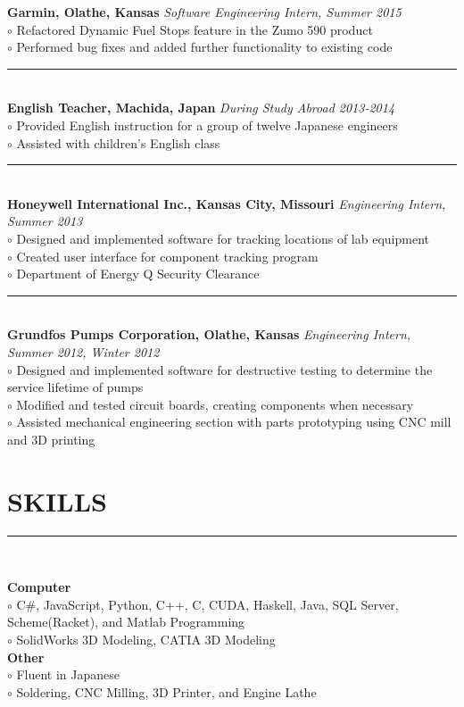 \documentclass[twoside]{article}
\begin{document}
\begin{adjustwidth}{0.2in}{0in}
\textbf{Garmin, Olathe, Kansas} \hfill \textit{Software Engineering Intern, Summer 2015}\\
$\circ$ Refactored Dynamic Fuel Stops feature in the Zumo 590 product\\
$\circ$ Performed bug fixes and added further functionality to existing code\\
\rule{7.3in}{0.5pt}\\
\textbf{English Teacher, Machida, Japan} \hfill \textit{During Study Abroad 2013-2014}\\
$\circ$ Provided English instruction for a group of twelve Japanese engineers\\
$\circ$ Assisted with children's English class\\
\rule{7.3in}{0.5pt}\\
\textbf{Honeywell International Inc., Kansas City, Missouri} \hfill \textit{Engineering Intern, Summer 2013}\\
$\circ$ Designed and implemented software for tracking locations of lab equipment\\
$\circ$ Created user interface for component tracking program\\
$\circ$ Department of Energy Q Security Clearance\\
\rule{7.3in}{0.5pt}\\
\textbf{Grundfos Pumps Corporation, Olathe, Kansas} \hfill \textit{Engineering Intern, Summer 2012, Winter 2012}\\
$\circ$ Designed and implemented software for destructive testing to determine the service lifetime of pumps\\
$\circ$ Modified and tested circuit boards, creating components when necessary\\
$\circ$ Assisted mechanical engineering section with parts prototyping using CNC mill and 3D printing\\
\end{adjustwidth}

\section*{SKILLS}
\vspace{-1em}
\rule{\textwidth}{1pt}\\
\begin{adjustwidth}{0.2in}{0in}
\vspace{-1em}
\textbf{Computer}\\
$\circ$ C\#, JavaScript, Python, C++, C, CUDA, Haskell, Java, SQL Server, Scheme(Racket), and Matlab Programming\\
$\circ$ SolidWorks 3D Modeling, CATIA 3D Modeling\\
\textbf{Other}\\
$\circ$ Fluent in Japanese\\
$\circ$ Soldering, CNC Milling, 3D Printer, and Engine Lathe\\
\end{adjustwidth}
\end{document}
